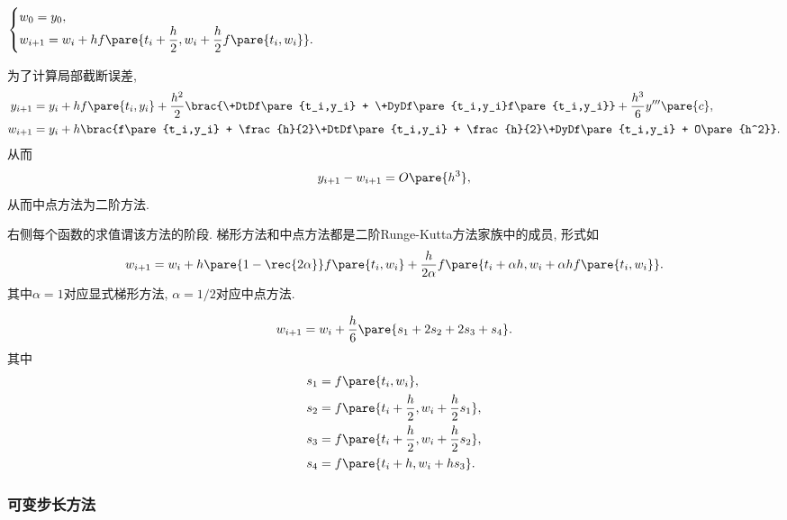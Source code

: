 \documentclass{ctexart}
\begin{document}
\begin{theorem}[中点方法]
    $\displaystyle \begin{cases}
        w_0 = y_0, \\
        \displaystyle w_{i+1} = w_i + hf\pare{t_i + \frac{h}{2}, w_i + \frac{h}{2}f\pare{t_i,w_i}}.
    \end{cases}$
\end{theorem}
为了计算局部截断误差,
\begin{align*}
    y_{i+1} &= y_i + hf\pare{t_i,y_i} + \frac{h^2}{2}\brac{\+DtDf\pare{t_i,y_i} + \+DyDf\pare{t_i,y_i}f\pare{t_i,y_i}} + \frac{h^3}{6}y'''\pare{c}, \\
    w_{i+1} &= y_i + h\brac{f\pare{t_i,y_i} + \frac{h}{2}\+DtDf\pare{t_i,y_i} + \frac{h}{2}\+DyDf\pare{t_i,y_i} + O\pare{h^2}}.
\end{align*}
从而
\[ y_{i+1} - w_{i+1} = O\pare{h^3}, \]
从而中点方法为二阶方法.
\par
右侧每个函数的求值谓该方法的阶段. 梯形方法和中点方法都是二阶Runge-Kutta方法家族中的成员, 形式如
\[ w_{i+1} = w_i + h\pare{1-\rec{2\alpha}}f\pare{t_i,w_i} + \frac{h}{2\alpha}f\pare{t_i + \alpha h, w_i + \alpha hf\pare{t_i,w_i}}. \]
其中$\alpha = 1$对应显式梯形方法, $\alpha = 1/2$对应中点方法.
\begin{theorem}
    \[ w_{i+1} = w_i + \frac{h}{6}\pare{s_1 + 2s_2 + 2s_3 + s_4}. \]
    其中
    \begin{align*}
        s_1 &= f\pare{t_i,w_i}, \\
        s_2 &= f\pare{t_i + \frac{h}{2}, w_i + \frac{h}{2}s_1}, \\
        s_3 &= f\pare{t_i + \frac{h}{2}, w_i + \frac{h}{2}s_2}, \\
        s_4 &= f\pare{t_i + h, w_i + hs_3}.
    \end{align*}
\end{theorem}


\subsubsection{可变步长方法} %
\label{ssub:可变步长方法}
\end{document}
